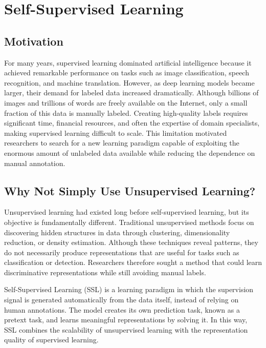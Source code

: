 \chapter{Self-Supervised Learning}

\section{Motivation}

For many years, supervised learning dominated artificial intelligence because it achieved remarkable performance on tasks such as image classification, speech recognition, and machine translation. However, as deep learning models became larger, their demand for labeled data increased dramatically. Although billions of images and trillions of words are freely available on the Internet, only a small fraction of this data is manually labeled. Creating high-quality labels requires significant time, financial resources, and often the expertise of domain specialists, making supervised learning difficult to scale. This limitation motivated researchers to search for a new learning paradigm capable of exploiting the enormous amount of unlabeled data available while reducing the dependence on manual annotation.


\section{Why Not Simply Use Unsupervised Learning?}

Unsupervised learning had existed long before self-supervised learning, but its objective is fundamentally different. Traditional unsupervised methods focus on discovering hidden structures in data through clustering, dimensionality reduction, or density estimation. Although these techniques reveal patterns, they do not necessarily produce representations that are useful for tasks such as classification or detection. Researchers therefore sought a method that could learn discriminative representations while still avoiding manual labels.

Self-Supervised Learning (SSL) is a learning paradigm in which the supervision signal is generated automatically from the data itself, instead of relying on human annotations. The model creates its own prediction task, known as a pretext task, and learns meaningful representations by solving it. In this way, SSL combines the scalability of unsupervised learning with the representation quality of supervised learning.

